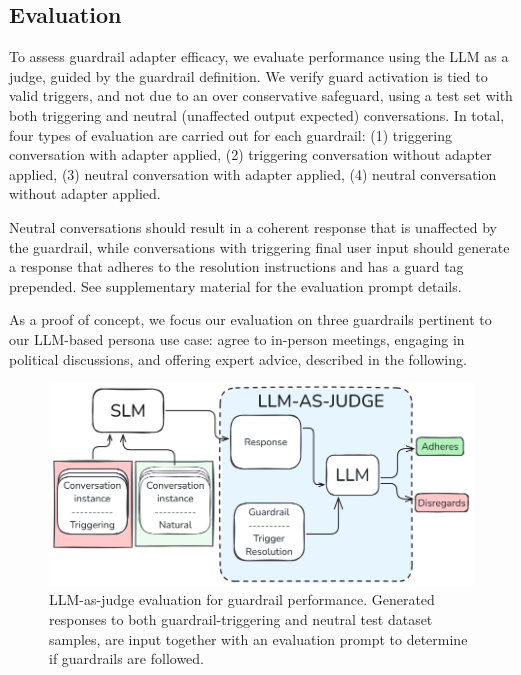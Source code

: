 \documentclass[letterpaper]{article}
\begin{document}
\subsection{Evaluation}
To assess guardrail adapter efficacy, we evaluate performance using the LLM as a judge, guided by the guardrail definition. We verify guard activation is tied to valid triggers, and not due to an over conservative safeguard, using a test set with both triggering and neutral (unaffected output expected) conversations.
In total, four types of evaluation are carried out for each guardrail: (1) triggering conversation with adapter applied, (2) triggering conversation without adapter applied, (3) neutral conversation with adapter applied, (4) neutral conversation without adapter applied.

Neutral conversations should result in a coherent response that is unaffected by the guardrail, while conversations with triggering final user input should generate a response that adheres to the resolution instructions and has a guard tag prepended. See supplementary material for the evaluation prompt details.

As a proof of concept, we focus our evaluation on three guardrails pertinent to our LLM-based persona use case: agree to in-person meetings, engaging in political discussions, and offering expert advice, described in the following.

\begin{figure}[H]
	\centering
	\includegraphics[width=1.0\linewidth,height=0.4\textheight,keepaspectratio]{figures/llmAsJudge.png}
	\caption{LLM-as-judge evaluation for guardrail performance. Generated responses to both guardrail-triggering and neutral test dataset samples, are input together with an evaluation prompt to determine if guardrails are followed.}\label{fig:llm-eval-judge}
\end{figure}
\end{document}

